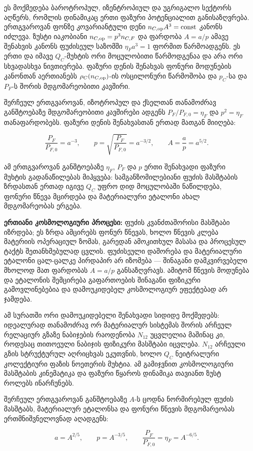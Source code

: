 \documentclass[11pt,a4paper]{article}
\begin{document}
ეს მოქმედება ბაროტროპულ, იზენტროპიულ და უგრიგალო სექტორს აღწერს, რომლის დინამიკაც ერთი ფაზური პოტენციალით განისაზღვრება. ერთგვაროვან ფონზე კოვარიანტული დენი $n_{C,{\rm op}}A^3=\mathrm{const}$ კანონს იძლევა. ზუსტი იაკობიანი $n_{C,{\rm op}}=p^3n_{C,F}$ და ფარდობა $A=a/p$ ამავე შენახვის კანონს ფუძისეულ საზომში $\eta_Fa^3=1$ ფორმით წარმოადგენს. ეს ერთი და იმავე $Q_C$-მუხტის ორი მოცულობითი წარმოდგენაა და არა ორი სხვადასხვა ნივთიერება. ფაზური დენის შენახვას ფონური მოდუნების კანონთან აერთიანებს $\rho_C(n_{C,{\rm op}})$-ის ოსცილონური წარმოშობა და $p_C$-სა და $P_F$-ს შორის მდგომარეობითი კავშირი.

შერჩეულ ერთგვაროვან, იზოტროპულ და ქსელთან თანამოძრავ განშტოებაზე მდგომარეობითი კავშირები ადგენს $P_F/P_{F,0}=\eta_F$ და $p^2=\eta_F$ თანაფარდობებს. ფაზური დენის შენახვასთან ერთად მათგან მიიღება:

\[
\frac{P_F}{P_{F,0}}=a^{-3}, \qquad
p=\sqrt{\frac{P_F}{P_{F,0}}}=a^{-3/2}, \qquad
A=\frac{a}{p}=a^{5/2}.
\]

ამ ერთგვაროვან განშტოებაზე $\eta_F$, $P_F$ და $p$ ერთი შენახვადი ფაზური მუხტის გადანაწილებას მიჰყვება: სამგანზომილებიანი ფუძის მასშტაბის ზრდასთან ერთად იგივე $Q_C$ უფრო დიდ მოცულობაში ნაწილდება, ფონური წნევა მცირდება და მატერიალური ეტალონი ახალ მდგომარეობას ერგება.

\textbf{ერთიანი კოსმოლოგიური პროცესი:} ფუძის კვანძთაშორისი მასშტაბი იზრდება; ეს ზრდა ამცირებს ფონურ წნევას, ხოლო წნევის კლება მატერიის ოპერაციულ ზომას, გარედან ამოკითხულ მასასა და პროცესულ ტაქტს შეთანხმებულად ცვლის. ფუძისეული დაშორება და მატერიალური ეტალონი ცალ-ცალკე პირდაპირ არ იზომება — შინაგანი დამკვირვებელი მხოლოდ მათ ფარდობას $A=a/p$ განსაზღვრავს. ამიტომ წნევის მოდუნება და ეტალონის შემცირება გაფართოების შინაგანი ფიზიკური გამოვლინებებია და დამოუკიდებელ კოსმოლოგიურ ეფექტებად არ ჯამდება.

ამ სურათში ორი დამოუკიდებელი შენახვადი სიდიდე მოქმედებს: იდეალურად თანამოძრავ ორ მატერიალურ სისტემას შორის არჩეულ რელაციურ გზაზე ნაბიჯების რაოდენობა $N_{12}$ უცვლელია მაშინაც კი, როდესაც თითოეული ნაბიჯის ფიზიკური მასშტაბი იცვლება. $N_{12}$ არჩეული გზის სტრუქტურულ აღრიცხვას ეკუთვნის, ხოლო $Q_C$ ნეიტრალური კოლექტიური ფაზის ნოეთერის მუხტია. ამ გამიჯვნით კოსმოლოგიური მასშტაბის კინემატიკა და ფაზური წყაროს დინამიკა თავიანთ ზუსტ როლებს ინარჩუნებს.

შერჩეულ ერთგვაროვან განშტოებაზე $A$-ს ცოდნა ნორმირებულ ფუძის მასშტაბს, მატერიალურ ეტალონსა და ფონური წნევის მდგომარეობას ერთმნიშვნელოვნად აღადგენს:

\[
a=A^{2/5}, \qquad
p=A^{-3/5}, \qquad
\frac{P_F}{P_{F,0}}=\eta_F=A^{-6/5}.
\]
\end{document}
